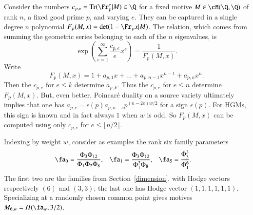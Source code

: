 \documentclass{notices}
\numberwithin{equation}{section}
\numberwithin{table}{section}
\numberwithin{figure}{section}
\DeclareMathOperator{\Tr}{Tr}
\begin{document}
{
Consider the numbers $c_{p,e} = \Tr(\Fr^e_p|M) \in \Q$
 for a fixed motive $M \in \cM(\Q,\Q)$ of rank $n$, a fixed good prime $p$, and varying $e$.  
They can be captured in a single degree $n$ polynomial
$F_p(M,x)=\det(1-\Fr_p x|M)$.  The relation, which comes from summing
the geometric series belonging to each of the $n$ eigenvalues, is
\begin{equation}
\label{expdef}
\exp \left(\sum_{e=1}^\infty \frac{c_{p,e}}{e} x^e \right) = \frac{1}{F_p(M,x)}.
\end{equation}
Write 
\[
F_p(M,x)=1 + a_{p,1} x + \dots + a_{p,n-1} x^{n-1} + a_{p,n} x^n.
\]
Then the $c_{p,e}$ for $e \leq k$ determine $a_{p,k}$. 
Thus the $c_{p,e}$ for $e \leq n$ determine $F_p(M,x)$.
But, even better, Poincar\'e
duality on a source variety ultimately implies that
one has $a_{p,e} = \epsilon(p) a_{p,n-e} p^{(n-2e)w/2}$
for a sign $\epsilon(p)$.   For HGMs, this sign is known
and in fact always $1$ when $w$ is odd.  So 
$F_p(M,x)$ can be computed using only $c_{p,e}$ for 
$e \leq \lfloor n/2 \rfloor$. 
 





  Indexing by weight $w$, consider as examples the 
rank six family parameters
\begin{align}
\fa_0 & = \frac{\Phi_3 \Phi_{12}}{\Phi_1 \Phi_2 \Phi_8}, &
\fa_1 & = \frac{\Phi_3 \Phi_{12}}{\Phi_1^2 \Phi_8}, &
\fa_5 & = \frac{\Phi^3_3}{\Phi_1^6}.  \label{qw}
\end{align}
The first two are the families from Section~\ref{dimension}, with
Hodge vectors respectively $(6)$ and $(3,3)$; the last one has
Hodge vector $(1,1,1,1,1,1)$.  Specializing at a 
randomly chosen common point gives motives
$M_{6,w} = H(\fa_{w},3/2)$.

}
\end{document}
